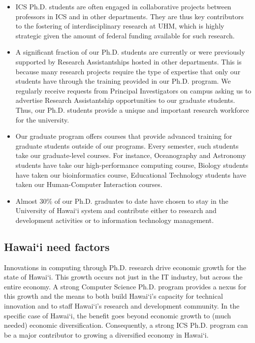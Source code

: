 \documentclass[12pt]{article}
\begin{document}
\begin{itemize}

\item ICS Ph.D. students are often engaged in collaborative projects
  between professors in ICS and in other departments.  They are thus key
  contributors to the fostering of interdisciplinary research at UHM, which
  is highly strategic given the amount of federal funding available for
  such research.

\item A significant fraction of our Ph.D. students are currently or
  were previously supported by Research Assistantships hosted in other
  departments. This is because many research projects require the type of
  expertise that only our students have through the training
  provided in our Ph.D. program. We regularly receive 
  requests from Principal Investigators on campus asking us to advertise
  Research Assistantship opportunities to our graduate students. Thus, our
  Ph.D. students provide a unique and important research workforce for the
  university.

\item Our graduate program offers courses that provide advanced training
  for graduate students outside of our programs. Every semester, such
  students take our graduate-level courses. For instance, Oceanography and
  Astronomy students have take our high-performance computing course,
  Biology students have taken our bioinformatics course, Educational
  Technology students have taken our Human-Computer Interaction courses.

\item Almost 30\% of our Ph.D. graduates to date have chosen to stay in the
  University of Hawai`i system and contribute either to research and
  development activities or to information technology management.
\end{itemize}

\subsection{Hawai`i need factors}

Innovations in computing through Ph.D. research drive economic growth for
the state of Hawai`i. This growth occurs not just in the IT industry, but
across the entire economy.  A strong Computer Science Ph.D. program
provides a nexus for this growth and the means to both build Hawai`i's
capacity for technical innovation and to staff Hawai`i's research and
development community.  In the specific case of Hawai`i, the benefit goes
beyond economic growth to (much needed) economic
diversification. Consequently, a strong ICS Ph.D. program can be a major
contributor to growing a diversified economy in Hawai`i.
\end{document}
